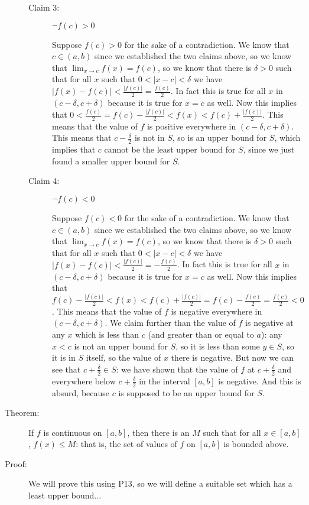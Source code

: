 \documentclass[12pt]{article}
\begin{document}
\begin{description}
\begin{description}
\item[Claim 3:]  $\neg f(c)>0$

Suppose $f(c)>0$ for the sake of a contradiction.  We know that $c \in (a,b)$ since we established the two claims above, so we know that $\lim_{x \rightarrow c}f(x)=f(c)$, so we know that there is $\delta>0$ such that for all $x$ such that $0<|x-c|<\delta$ we have $|f(x)-f(c)|<\frac{|f(c)|}2=\frac{f(c)}2$.  In fact this is true for all $x$ in $(c-\delta,c+\delta)$ because it is true for $x=c$ as well.  Now this implies that $0<\frac{f(c)}2 = f(c)-\frac{|f(c)|}2<f(x)<f(c)+\frac{|f(c)|}2$.
This means that the value of $f$ is positive everywhere in $(c-\delta,c+\delta)$.  This means that $c-\frac{\delta}2$ is not in $S$, so is an upper bound for $S$,
which implies that $c$ cannot be the least upper bound for $S$, since we just found a smaller upper bound for $S$.

\item[Claim 4:]  $\neg f(c)<0$

Suppose $f(c)<0$ for the sake of a contradiction.  We know that $c \in (a,b)$ since we established the two claims above, so we know that $\lim_{x \rightarrow c}f(x)=f(c)$, so we know that there is $\delta>0$ such that for all $x$ such that $0<|x-c|<\delta$ we have $|f(x)-f(c)|<\frac{|f(c)|}2=-\frac{f(c)}2$.  In fact this is true for all $x$ in $(c-\delta,c+\delta)$ because it is true for $x=c$ as well.  Now this implies that $f(c)-\frac{|f(c)|}2<f(x)<f(c)+\frac{|f(c)|}2=f(c)-\frac{f(c)}2=\frac{f(c)}2<0$.
This means that the value of $f$ is negative everywhere in $(c-\delta,c+\delta)$.  We claim further than the value of $f$ is negative at any $x$ which is less than
$c$ (and greater than or equal to $a$):  any $x<c$ is not an upper bound for $S$, so it is less than some $y \in S$, so it is in $S$ itself, so the value of $x$
there is negative.  But now we can see that $c+\frac{\delta}2 \in S$:  we have shown that the value of $f$ at $c+\frac{\delta}2$ and everywhere below $c+\frac{\delta}2$ in the interval $[a,b]$ is negative.  And this is absurd, because $c$ is supposed to be an upper bound for $S$.

\end{description}


\item[Theorem:]  If $f$ is continuous on $[a,b]$, then there is an $M$ such that for all $x \in [a,b]$, $f(x)\leq M$:  that is, the set of values
of $f$ on $[a,b]$ is bounded above.

\item[Proof:]  We will prove this using P13, so we will define a suitable set which has a least upper bound...


\end{description}
\end{document}
